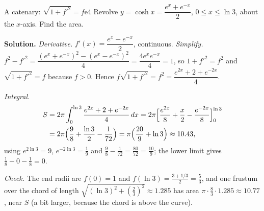 \documentclass[11pt]{article}
\begin{document}
\begin{exmp}{A catenary: $\sqrt{1+f'^2}=f$}{e4}
Revolve $y=\cosh x=\dfrac{e^x+e^{-x}}2$, $0\le x\le\ln3$, about the $x$-axis. Find the area.

\textbf{Solution.} \emph{Derivative.} $f'(x)=\dfrac{e^x-e^{-x}}2$, continuous. \emph{Simplify.} $f^2-f'^2=\dfrac{(e^x+e^{-x})^2-(e^x-e^{-x})^2}4=\dfrac{4e^xe^{-x}}4=1$, so $1+f'^2=f^2$ and $\sqrt{1+f'^2}=f$ because $f>0$. Hence $f\sqrt{1+f'^2}=f^2=\dfrac{e^{2x}+2+e^{-2x}}4$.

\emph{Integral.}
\[
\begin{aligned}
S&=2\pi\int_0^{\ln3}\frac{e^{2x}+2+e^{-2x}}4\,dx=2\pi\Bigl[\frac{e^{2x}}8+\frac x2-\frac{e^{-2x}}8\Bigr]_0^{\ln3}\\
&=2\pi\Bigl(\frac98+\frac{\ln3}2-\frac1{72}\Bigr)=\pi\Bigl(\frac{20}9+\ln3\Bigr)\approx10.43 ,
\end{aligned}
\]
using $e^{2\ln3}=9$, $e^{-2\ln3}=\frac19$ and $\frac98-\frac1{72}=\frac{80}{72}=\frac{10}9$; the lower limit gives $\frac18-0-\frac18=0$.

\emph{Check.} The end radii are $f(0)=1$ and $f(\ln3)=\frac{3+1/3}2=\frac53$, and one frustum over the chord of length $\sqrt{(\ln3)^2+(\frac23)^2}\approx1.285$ has area $\pi\cdot\frac83\cdot1.285\approx10.77$, near $S$ (a bit larger, because the chord is above the curve).


\end{exmp}
\end{document}
